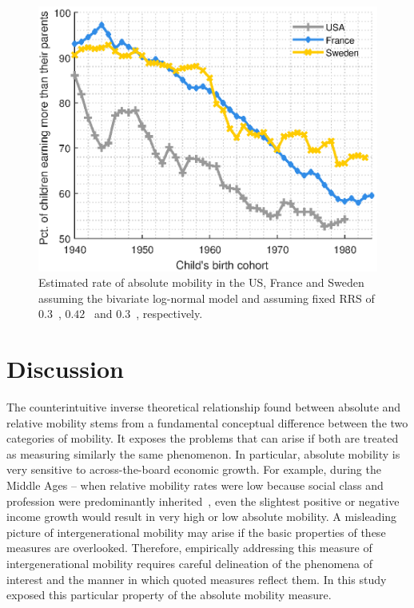 \documentclass[12pt]{article}
\newcommand{\flabel}[1]{\label{fig:#1}}
\numberwithin{equation}{section}
\begin{document}
\begin{figure}[!htb]
\centering
\includegraphics[width=1.0\textwidth] {./figs/countries0.eps}
\caption{Estimated rate of absolute mobility in the US, France and Sweden assuming the bivariate log-normal model and assuming fixed RRS of $0.3$~\citep{chetty2014land}, $0.42$~\citep{lefranc2005intergenerational} and $0.3$~\citep{bjorklund1997intergenerational}, respectively.}
\flabel{countries}
\end{figure}

\section{Discussion}

The counterintuitive inverse theoretical relationship found between absolute and relative mobility stems from a fundamental conceptual difference between the two categories of mobility. It exposes the problems that can arise if both are treated as measuring similarly the same phenomenon. In particular, absolute mobility is very sensitive to across-the-board economic growth. For example, during the Middle Ages -- when relative mobility rates were low because social class and profession were predominantly inherited~\citep{goldthorpe1982social,clark2014also}, even the slightest positive or negative income growth would result in very high or low absolute mobility. A misleading picture of intergenerational mobility may arise if the basic properties of these measures are overlooked. Therefore, empirically addressing this measure of intergenerational mobility requires careful delineation of the phenomena of interest and the manner in which quoted measures reflect them. In this study exposed this particular property of the absolute mobility measure.
\end{document}
